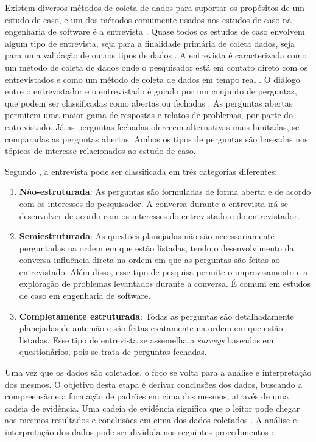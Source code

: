 Existem diversos métodos de coleta de dados para suportar os propósitos de um estudo de caso, e um dos métodos comumente usados nos estudos de caso na engenharia de software é a entrevista \cite{caseStudySE}. Quase todos os estudos de caso envolvem algum tipo de entrevista, seja para a finalidade primária de coleta dados, seja para uma validação de outros tipos de dados \cite{caseStudySE}. A entrevista é caracterizada como um método de coleta de dados onde o pesquisador está em contato direto com os entrevistados e como um método de coleta de dados em tempo real \cite{caseStudySE}. O diálogo entre o entrevistador e o entrevistado é guiado por um conjunto de perguntas, que podem ser classificadas como abertas ou fechadas \cite{caseStudySE}. As perguntas abertas permitem uma maior gama de respostas e relatos de problemas, por parte do entrevistado. Já as perguntas fechadas oferecem alternativas mais limitadas, se comparadas as perguntas abertas. Ambos os tipos de perguntas são baseadas nos tópicos de interesse relacionados ao estudo de caso. 

Segundo \cite{caseStudySE}, a entrevista pode ser classificada em três categorias diferentes:
\begin{enumerate}
\item \textbf{Não-estruturada}: As perguntas são formuladas de forma aberta e de acordo com os interesses do pesquisador. A conversa durante a entrevista irá se desenvolver de acordo com os interesses do entrevistado e do entrevistador.
\item \textbf{Semiestruturada}: As questões planejadas não são necessariamente perguntadas na ordem em que estão listadas, tendo o desenvolvimento da conversa influência direta na ordem em que as perguntas são feitas ao entrevistado. Além disso, esse tipo de pesquisa permite o improvisamento e a exploração de problemas levantados durante a conversa. É comum em estudos de caso em engenharia de software.
\item \textbf{Completamente estruturada}: Todas as perguntas são detalhadamente planejadas de antemão e são feitas exatamente na ordem em que estão listadas. Esse tipo de entrevista se assemelha a \textit{surveys} baseados em questionários, pois se trata de perguntas fechadas.
\end{enumerate}
	
Uma vez que os dados são coletados, o foco se volta para a análise e interpretação dos mesmos. O objetivo desta etapa é derivar conclusões dos dados, buscando a compreensão e a formação de padrões em cima dos mesmos, através de uma cadeia de evidência. Uma cadeia de evidência significa que o leitor pode chegar aos mesmos resultados e conclusões em cima dos dados coletados \cite{caseStudySE}. A análise e interpretação dos dados pode ser dividida nos seguintes procedimentos \cite{caseStudySE}:

